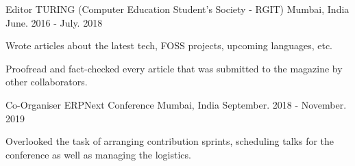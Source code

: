 

\begin{cventries}

  \cventry
    {Editor} %
    {TURING (Computer Education Student's Society - RGIT)} %
    {Mumbai, India} %
    {June. 2016 - July. 2018} %
    {
      \begin{cvitems} %
        \item {Wrote articles about the latest tech, FOSS projects, upcoming languages, etc.}
        \item {Proofread and fact-checked every article that was submitted to the magazine by other collaborators.}
      \end{cvitems}
    }

  \cventry
    {Co-Organiser} %
    {ERPNext Conference} %
    {Mumbai, India} %
    {September. 2018 - November. 2019} %
    {
      \begin{cvitems} %
        \item {Overlooked the task of arranging contribution sprints, scheduling talks for the conference as well as managing the logistics.}
      \end{cvitems}
    }

\end{cventries}
